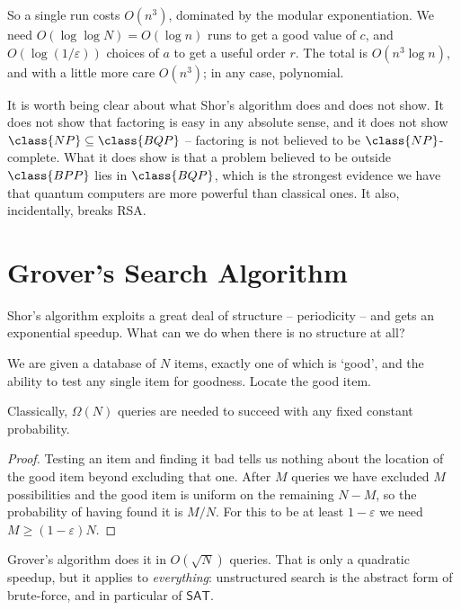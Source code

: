 So a single run costs $O(n^3)$, dominated by the modular exponentiation. We need $O(\log\log N) = O(\log n)$ runs to get a good value of $c$, and $O(\log(1/\varepsilon))$ choices of $a$ to get a useful order $r$. The total is $O(n^3\log n)$, and with a little more care $O(n^3)$; in any case, polynomial.

\begin{remark}
	It is worth being clear about what Shor's algorithm does and does not show. It does not show that factoring is easy in any absolute sense, and it does not show $\class{NP}\subseteq\class{BQP}$ -- factoring is not believed to be $\class{NP}$-complete. What it does show is that a problem believed to be outside $\class{BPP}$ lies in $\class{BQP}$, which is the strongest evidence we have that quantum computers are more powerful than classical ones. It also, incidentally, breaks RSA.
\end{remark}

\section{Grover's Search Algorithm}\label{sec:grover}

Shor's algorithm exploits a great deal of structure -- periodicity -- and gets an exponential speedup. What can we do when there is no structure at all?

\begin{problem*}
	We are given a database of $N$ items, exactly one of which is `good', and the ability to test any single item for goodness. Locate the good item.
\end{problem*}

\begin{proposition}
	Classically, $\Omega(N)$ queries are needed to succeed with any fixed constant probability.
\end{proposition}

\begin{proof}
	Testing an item and finding it bad tells us nothing about the location of the good item beyond excluding that one. After $M$ queries we have excluded $M$ possibilities and the good item is uniform on the remaining $N - M$, so the probability of having found it is $M/N$. For this to be at least $1-\varepsilon$ we need $M\geq(1-\varepsilon)N$.
\end{proof}

Grover's algorithm does it in $O(\sqrt N)$ queries. That is only a quadratic speedup, but it applies to \emph{everything}: unstructured search is the abstract form of brute-force, and in particular of $\mathsf{SAT}$.

